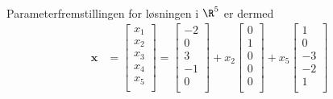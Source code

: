 \begin{eks}
\begin{align*}
\end{align*}
%
Parameterfremstillingen for løsningen i $\R^5$ er dermed
%
  \begin{align*}
    \mathbf{x} &= \begin{bmatrix}
           x_{1} \\
           x_{2} \\
           x_{3} \\
           x_{4} \\
           x_{5} \\
         \end{bmatrix} 
         = \begin{bmatrix}
           -2 \\
           0 \\
           3 \\
           -1 \\
           0 \\
         \end{bmatrix}
         +x_2 \begin{bmatrix}
           0 \\
           1 \\
           0 \\
           0 \\
           0 \\
         \end{bmatrix}
         +x_5 \begin{bmatrix}
           1 \\
           0 \\
           -3 \\
           -2 \\
           1 \\
         \end{bmatrix}
  \end{align*} 
%
\label{eks_gauss}
%
%
\end{eks}
%
%
